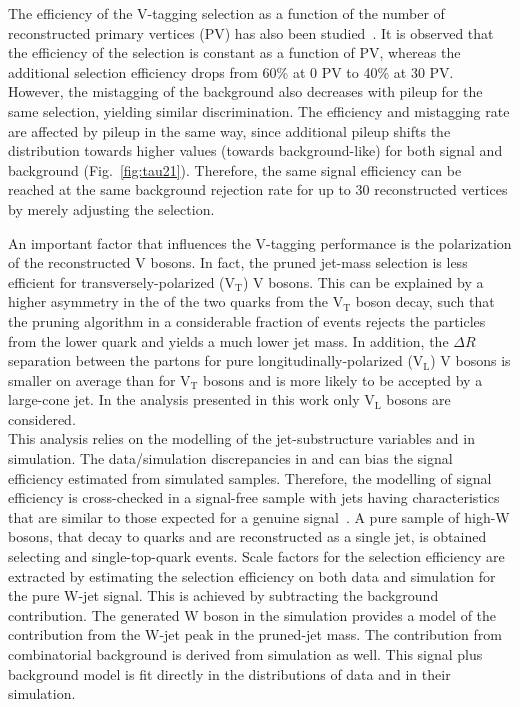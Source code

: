 The efficiency of the V-tagging selection as a function of the number of reconstructed primary vertices (PV) has also been studied~\cite{JME-16-003}. It is observed that the efficiency of the \mJ selection is constant as a function of PV, whereas the additional \nsubj selection efficiency drops from 60\% at 0 PV to 40\% at 30 PV. However, the mistagging of the background also decreases with pileup for the same selection, yielding similar discrimination. The efficiency and mistagging rate are affected by pileup in the same way, since additional pileup shifts the \nsubj distribution towards higher values (towards background-like) for both signal and background (Fig.~\ref{fig:tau21}). Therefore, the same signal efficiency can be reached at the same background rejection rate for up to 30 reconstructed vertices by merely adjusting the \nsubj selection.

An important factor that influences the V-tagging performance is the polarization of the reconstructed V bosons. In fact, the pruned jet-mass selection is less efficient for transversely-polarized (V$_\mathrm{T}$) V bosons. This can be explained by a higher asymmetry in the \pt of the two quarks from the V$_\mathrm{T}$ boson decay, such that the pruning algorithm in a considerable fraction of events rejects the particles from the lower \pt quark and yields a much lower jet mass. In addition, the $\Delta R$ separation between the partons for pure longitudinally-polarized (V$_\mathrm{L}$) V bosons is smaller on average than for V$_\mathrm{T}$ bosons and is more likely to be accepted by a large-cone jet. In the analysis presented in this work only V$_\mathrm{L}$  bosons are considered.\\

This analysis relies on the modelling of the jet-substructure variables \mJ and \nsubj in simulation. The data/simulation discrepancies in \mJ and \nsubj can bias the signal efficiency estimated from simulated samples. Therefore, the modelling of signal efficiency is cross-checked in a signal-free sample with jets having characteristics that are similar to those expected for a genuine signal~\cite{JME-16-003}. A pure sample of high-\pt W bosons, that decay to quarks and are reconstructed as a single jet, is obtained selecting \ttbar and single-top-quark events.
Scale factors for the \nsubj selection efficiency are extracted by estimating the selection efficiency on both data and simulation for the pure W-jet signal. This is achieved by subtracting the background contribution.
The generated W boson in the \ttbar simulation provides a model of the contribution from the W-jet peak in the pruned-jet mass. The contribution from combinatorial background is derived from \ttbar simulation as well. This signal plus background model is fit directly in the distributions of data and in their simulation.

